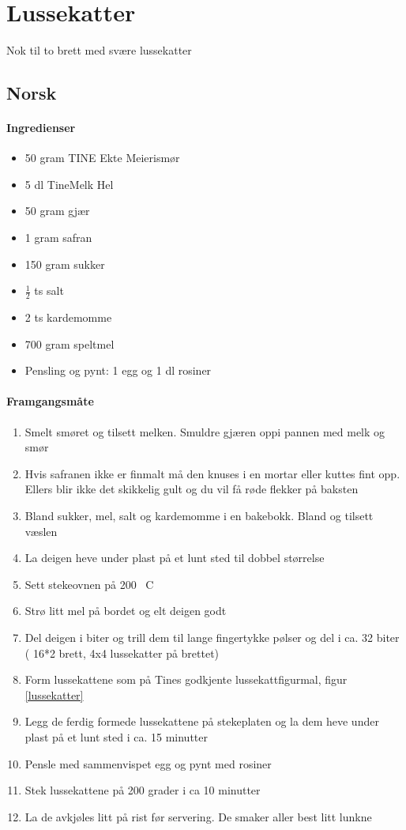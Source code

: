 \section{﻿Lussekatter}
Nok til to brett med svære lussekatter
\subsection{Norsk}

\paragraph{Ingredienser}
\begin{itemize}[noitemsep]
	\item 50 gram TINE Ekte Meierismør
	\item 5 dl TineMelk Hel
	\item 50 gram gjær
	\item 1 gram safran
	\item 150 gram sukker
	\item $\frac{1}{2}$ ts salt
	\item 2 ts kardemomme
	\item 700 gram speltmel
	\item Pensling og pynt: 1 egg og 1 dl rosiner
\end{itemize}

\paragraph{Framgangsmåte}
\begin{enumerate}[noitemsep]
	\item Smelt smøret og tilsett melken. Smuldre gjæren oppi pannen med melk og smør
	\item Hvis safranen ikke er finmalt må den knuses i en mortar eller kuttes fint opp. Ellers blir ikke det skikkelig gult og du vil få røde flekker på baksten
	\item Bland sukker, mel, salt og kardemomme i en bakebokk. Bland og tilsett væslen
	\item La deigen heve under plast på et lunt sted til dobbel størrelse
	\item Sett stekeovnen på 200 \degree~C
	\item Strø litt mel på bordet og elt deigen godt
	\item Del deigen i biter og trill dem til lange fingertykke pølser og del i ca. 32 biter ( 16*2 brett, 4x4 lussekatter på brettet)
	\item Form lussekattene som på Tines godkjente lussekattfigurmal, figur  \ref{lussekatter}
	\item Legg de ferdig formede lussekattene på stekeplaten og la dem heve under plast på et lunt sted i ca. 15 minutter
	\item Pensle med sammenvispet egg og pynt med rosiner
	\item Stek lussekattene på 200 grader i  ca 10 minutter
	\item La de avkjøles litt på rist før servering. De smaker aller best litt lunkne
\end{enumerate}

